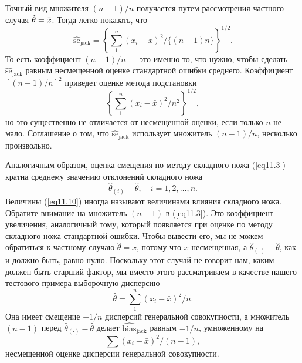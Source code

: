 Точный вид множителя $(n-1)/n$ получается путем рассмотрения частного случая $\hat{\theta} = \Bar{x}$. Тогда легко показать, что
\begin{equation}\label{eq11.8}
   \widehat{\text{se}}_{\text{jack}} = \left\{\sum\limits_{1}^{n}(x_i-\bar{x})^2/\{(n-1)n\}\right\}^{1/2}.
\end{equation}
То есть коэффициент $(n-1)/n$ --- это именно то, что нужно, чтобы сделать $\widehat{\text{se}}_{\text{jack}}$ равным несмещенной оценке стандартной ошибки среднего. Коэффициент $[(n-1)/n]^2$ приведет оценке метода подстановки
\begin{equation}\label{eq11.9}
   \left\{\sum\limits_{1}^{n}(x_i-\bar{x})^2/n^{2}\right\}^{1/2},
\end{equation}
но это существенно не отличается от несмещенной оценки, если только $n$ не мало. Соглашение о том, что $\widehat{\text{se}}_{\text{jack}}$ использует множитель $(n-1)/n$,  несколько произвольно.

Аналогичным образом, оценка смещения по методу складного ножа (\ref{eq11.3}) кратна среднему значению отклонений складного ножа
\begin{equation}\label{eq11.10}
   \hat{\theta}_{(i)} - \hat{\theta}, \quad i = 1, 2, \dots, n.
\end{equation}
Величины (\ref{eq11.10}) иногда называют величинами влияния складного ножа. Обратите внимание на множитель $(n-1)$ в (\ref{eq11.3}). Это коэффициент увеличения, аналогичный тому, который появляется при оценке по методу складного ножа стандартной ошибки. Чтобы вывести его, мы не можем обратиться к частному случаю $\hat{\theta} = \bar{x}$, потому что $\bar{x}$ несмещенная, а $\hat{\theta}_{(\cdot)} - \hat{\theta}$, как и должно быть, равно нулю. Поскольку этот случай не говорит нам, каким должен быть старший фактор, мы вместо этого рассматриваем в качестве нашего тестового примера выборочную дисперсию
\begin{equation}\label{eq11.11}
   \hat{\theta} = \sum\limits_{1}^{n}(x_{i}-\bar{x})^{2}/n.
\end{equation}
Она имеет смещение $-1/n$ дисперсий генеральной совокупности, а множитель $(n-1)$ перед $\hat{\theta}_{(\cdot)} - \hat{\theta}$ делает $\widehat{\text{bias}}_{\text{jack}}$ равным $-1/n$, умноженному на $$\sum(x_i-\bar{x})^2/(n-1),$$ несмещенной оценке дисперсии генеральной совокупности.
